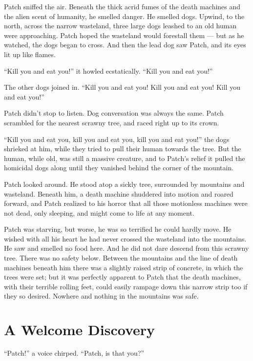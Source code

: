 \documentclass[ebook,oneside,openany,17pt]{memoir}
\newenvironment{tolerant}[1]{%
  \par\tolerance=#1\relax
}{%
  \par
}
\renewcommand{\thechapter}{\Roman{chapter}}
\newcounter{sections}
\newcommand{\sections}[1]{%
  \section*{#1}
  \addtocounter{sections}{1}%
  \pdfbookmark[1]{#1}{section.\thechapter.\thesections}}
\begin{document}
\begin{tolerant}{1000}
Patch sniffed the air. Beneath the thick acrid fumes of the death
machines and the alien scent of humanity, he smelled danger. He
smelled dogs. Upwind, to the north, across the narrow wasteland, three
large dogs leashed to an old human were approaching. Patch hoped the
wasteland would forestall them — but as he watched, the dogs began to
cross. And then the lead dog saw Patch, and its eyes lit up like
flames.
\end{tolerant}

“Kill you and eat you!” it howled ecstatically. “Kill you and eat
you!”

The other dogs joined in. “Kill you and eat you! Kill you and eat you!
Kill you and eat you!”

Patch didn’t stop to listen. Dog conversation was always the
same. Patch scrambled for the nearest scrawny tree, and raced right up
to its crown.

“Kill you and eat you, kill you and eat you, kill you and eat you!”
the dogs shrieked at him, while they tried to pull their human towards
the tree. But the human, while old, was still a massive creature, and
to Patch’s relief it pulled the homicidal dogs along until they
vanished behind the corner of the mountain.

Patch looked around. He stood atop a sickly tree, surrounded by
mountains and wasteland. Beneath him, a death machine shuddered into
motion and roared forward, and Patch realized to his horror that all
those motionless machines were not dead, only sleeping, and might come
to life at any moment.

\begin{tolerant}{500}
Patch was starving, but worse, he was so terrified he could hardly
move. He wished with all his heart he had never crossed the wasteland
into the mountains. He saw and smelled no food here. And he did not
dare descend from this scrawny tree. There was no safety
below. Between the mountains and the line of death machines beneath
him there was a slightly raised strip of concrete, in which the trees
were set; but it was perfectly apparent to Patch that the death
machines, with their terrible rolling feet, could easily rampage down
this narrow strip too if they so desired. Nowhere and nothing in the
mountains was safe.
\end{tolerant}


\sections{A Welcome Discovery}

“Patch!” a voice chirped. “Patch, is that you?”
\end{document}
